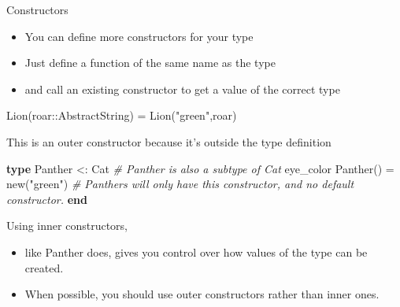\documentclass[ignorenonframetext,]{beamer}
\newenvironment{Shaded}{}{}
\newcommand{\KeywordTok}[1]{\textcolor[rgb]{0.00,0.44,0.13}{\textbf{{#1}}}}
\newcommand{\StringTok}[1]{\textcolor[rgb]{0.25,0.44,0.63}{{#1}}}
\newcommand{\CommentTok}[1]{\textcolor[rgb]{0.38,0.63,0.69}{\textit{{#1}}}}
\newcommand{\NormalTok}[1]{{#1}}
\providecommand{\tightlist}{%
  \setlength{\itemsep}{0pt}\setlength{\parskip}{0pt}}
\begin{document}
\begin{frame}[fragile]{Constructors}

\begin{itemize}
\tightlist
\item
  You can define more constructors for your type
\item
  Just define a function of the same name as the type
\item
  and call an existing constructor to get a value of the correct type
\end{itemize}

\begin{Shaded}
\begin{Highlighting}[]
\NormalTok{Lion(roar::AbstractString) = Lion(}\StringTok{"green"}\NormalTok{,roar)}
\end{Highlighting}
\end{Shaded}

\end{frame}

\begin{frame}[fragile]{This is an outer constructor because it's outside
the type definition}

\begin{Shaded}
\begin{Highlighting}[]
\KeywordTok{type} \NormalTok{Panther <: Cat }\CommentTok{# Panther is also a subtype of Cat}
  \NormalTok{eye_color}
  \NormalTok{Panther() = new(}\StringTok{"green"}\NormalTok{)}
  \CommentTok{# Panthers will only have this constructor, and no default constructor.}
\KeywordTok{end}
\end{Highlighting}
\end{Shaded}

\end{frame}

\begin{frame}{Using inner constructors,}

\begin{itemize}
\item
  like Panther does, gives you control over how values of the type can
  be created.
\item
  When possible, you should use outer constructors rather than inner
  ones.
\end{itemize}

\end{frame}
\end{document}
